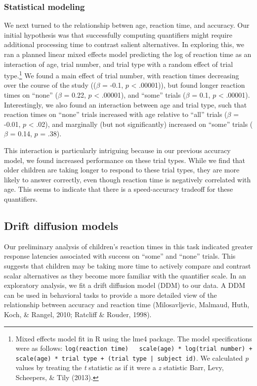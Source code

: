 \documentclass[10pt, letterpaper]{article}
\begin{document}
\subsubsection{Statistical modeling}\label{statistical-modeling-1}

We next turned to the relationship betwen age, reaction time, and
accuracy. Our initial hypothesis was that successfully computing
quantifiers might require additional processing time to contrast salient
alternatives. In exploring this, we ran a planned linear mixed effects
model predicting the log of reaction time as an interaction of age,
trial number, and trial type with a random effect of trial
type.\footnote{Mixed effects model fit in R using the lme4 package. The
  model specifications were as follows:
  \texttt{log(reaction time) ~ scale(age) * log(trial number) + scale(age) * trial type + (trial type | subject id)}.
  We calculated \emph{p} values by treating the \emph{t} statistic as if
  it were a \emph{z} statistic Barr, Levy, Scheepers, \& Tily (2013).}
We found a main effect of trial number, with reaction times decreasing
over the course of the study ((\(\beta\) = -0.1, \(p\) \textless{}
.00001)), but found longer reaction times on ``none'' (\(\beta\) = 0.22,
\(p\) \textless{} .00001), and ``some'' trials (\(\beta\) = 0.1, \(p\)
\textless{} .00001). Interestingly, we also found an interaction between
age and trial type, such that reaction times on ``none'' trials
increased with age relative to ``all'' trials (\(\beta\) = -0.01, \(p\)
\textless{} .02), and marginally (but not significantly) increased on
``some'' trials (\(\beta\) = 0.14, \(p\) = .38).

This interaction is particularly intriguing because in our previous
accuracy model, we found increased performance on these trial types.
While we find that older children are taking longer to respond to these
trial types, they are more likely to answer correctly, even though
reaction time is negatively correlated with age. This seems to indicate
that there is a speed-accuracy tradeoff for these quantifiers.

\subsection{Drift diffusion models}\label{drift-diffusion-models}

Our preliminary analysis of children's reaction times in this task
indicated greater response latencies associated with success on ``some''
and ``none'' trials. This suggests that children may be taking more time
to actively compare and contrast scalar alternatives as they become more
familiar with the quantifier scale. In an exploratory analysis, we fit a
drift diffusion model (DDM) to our data. A DDM can be used in behavioral
tasks to provide a more detailed view of the relationship between
accuracy and reaction time (Milosavljevic, Malmaud, Huth, Koch, \&
Rangel, 2010; Ratcliff \& Rouder, 1998).
\end{document}
